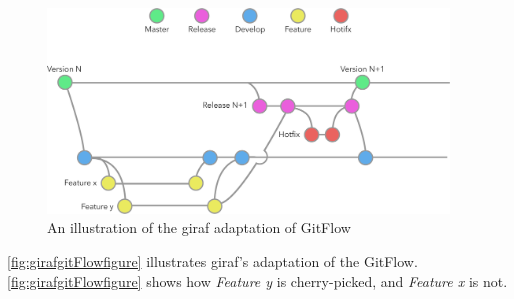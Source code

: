\begin{figure}[H]
        \begin{center}
            \includegraphics[width=0.95\textwidth]{figures/gitflow_overview.pdf}
        \end{center}
        \caption{An illustration of the \gls{giraf} adaptation of GitFlow}
        \label{fig:girafgitFlowfigure}
\end{figure}

\autoref{fig:girafgitFlowfigure} illustrates \gls{giraf}'s adaptation of the GitFlow. \autoref{fig:girafgitFlowfigure} shows how \textit{Feature y} is cherry-picked, and \textit{Feature x} is not.
